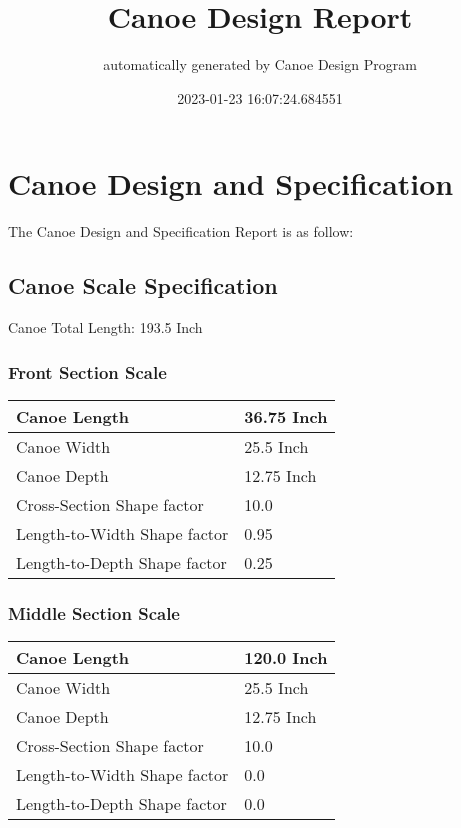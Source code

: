 \documentclass{article}%
\title{Canoe Design Report}%
\author{automatically generated by Canoe Design Program}%
\date{2023{-}01{-}23 16:07:24.684551}%
\begin{document}
%
\normalsize%
\selectfont%
\fontsize{12}{15}%
\pagestyle{fancy}%
\maketitle%
\thispagestyle{fancy}%
\section{Canoe Design and Specification}%
\label{sec:CanoeDesignandSpecification}%
The Canoe Design and Specification Report is as follow: %
\subsection{Canoe Scale Specification}%
\label{subsec:CanoeScaleSpecification}%
Canoe Total Length: 193.5 Inch%
\subsubsection{Front Section Scale}%
\label{ssubsec:FrontSectionScale}%
\renewcommand{\arraystretch}{1.5}%
\begin{tabular}{|l|l|}%
\hline%
Canoe Length&36.75 Inch\\%
\hline%
Canoe Width&25.5 Inch\\%
\hline%
Canoe Depth&12.75 Inch\\%
\hline%
Cross{-}Section Shape factor&10.0\\%
\hline%
Length{-}to{-}Width Shape factor&0.95\\%
\hline%
Length{-}to{-}Depth Shape factor&0.25\\%
\hline%
\end{tabular}

%
\subsubsection{Middle Section Scale}%
\label{ssubsec:MiddleSectionScale}%
\renewcommand{\arraystretch}{1.5}%
\begin{tabular}{|l|l|}%
\hline%
Canoe Length&120.0 Inch\\%
\hline%
Canoe Width&25.5 Inch\\%
\hline%
Canoe Depth&12.75 Inch\\%
\hline%
Cross{-}Section Shape factor&10.0\\%
\hline%
Length{-}to{-}Width Shape factor&0.0\\%
\hline%
Length{-}to{-}Depth Shape factor&0.0\\%
\hline%
\end{tabular}
\end{document}

